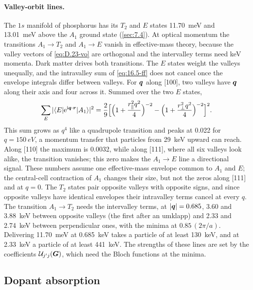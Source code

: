 \paragraph{Valley-orbit lines.} The $1s$ manifold of phosphorus has its $T_2$ and $E$ states \SI{11.70}{meV} and \SI{13.01}{meV} above the $A_1$ ground state (\cref{sec:7.4}). At optical momentum the transitions $A_1 \to T_2$ and $A_1 \to E$ vanish in effective-mass theory, because the valley vectors of \cref{eq:D.23-vo} are orthogonal and the intervalley terms need keV momenta. Dark matter drives both transitions. The $E$ states weight the valleys unequally, and the intravalley sum of \cref{eq:16.5-ff} does not cancel once the envelope integrals differ between valleys. For $\bm{q}$ along [100], two valleys have $\bm{q}$ along their axis and four across it. Summed over the two $E$ states,
\begin{equation}
  \sum_E|\langle E|\mathrm{e}^{\mathrm{i}\bm{q}\cdot\bm{r}}|A_1\rangle|^2 = \frac29\Bigl[\Bigl(1 + \frac{r_\parallel^2q^2}{4}\Bigr)^{-2} - \Bigl(1 + \frac{r_\perp^2q^2}{4}\Bigr)^{-2}\Bigr]^2 .
  \label{eq:16.5-E}
\end{equation}
This sum grows as $q^4$ like a quadrupole transition and peaks at 0.022 for $q = \SI{150}{eV}$, a momentum transfer that particles from \SI{29}{keV} upward can reach. Along [110] the maximum is 0.0032, while along [111], where all six valleys look alike, the transition vanishes; this zero makes the $A_1 \to E$ line a directional signal. These numbers assume one effective-mass envelope common to $A_1$ and $E$; the central-cell contraction of $A_1$ changes their size, but not the zeros along [111] and at $q = 0$. The $T_2$ states pair opposite valleys with opposite signs, and since opposite valleys have identical envelopes their intravalley terms cancel at every $q$. The transition $A_1 \to T_2$ needs the intervalley terms, at $|\bm{q}| = 0.685$, 3.60 and \SI{3.88}{keV} between opposite valleys (the first after an umklapp) and 2.33 and \SI{2.74}{keV} between perpendicular ones, with the minima at $0.85\,(2\pi/a)$. Delivering \SI{11.70}{meV} at \SI{0.685}{keV} takes a particle of at least \SI{130}{keV}, and at \SI{2.33}{keV} a particle of at least \SI{441}{keV}. The strengths of these lines are set by the coefficients $\mathcal{U}_{j'j}(\bm{G})$, which need the Bloch functions at the minima.

\subsection{Dopant absorption}\label{sec:16.5-absorption}

